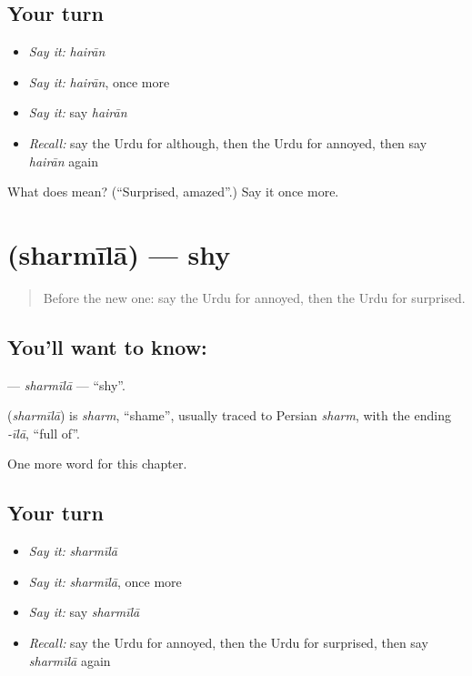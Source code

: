 \subsection*{Your turn}
\begin{itemize}
\raggedright
  \item \emph{Say it:} \emph{hairān}
  \item \emph{Say it:} \emph{hairān}, once more
  \item \emph{Say it:} say \emph{hairān}
  \item \emph{Recall:} say the Urdu for although, then the Urdu for annoyed, then say \emph{hairān} again
\end{itemize}

\begin{tcolorbox}[breakable,colback=teal!4,colframe=teal!35!black,title={Before you move on}]
What does  mean? (\textquotedblleft{}Surprised, amazed\textquotedblright{}.) Say it once more.
\end{tcolorbox}
\section[\texorpdfstring{\ur{شرمیلا} (sharmīlā)}{شرمیلا (sharmīlā)}]{ (sharmīlā) — shy}

\label{lesson:UR-C221-sharmila}



\begin{quote}
Before the new one: say the Urdu for annoyed, then the Urdu for surprised.
\end{quote}

\subsection*{You'll want to know: }
\textbf{} — \emph{sharmīlā} — \textquotedblleft{}shy\textquotedblright{}.

\begin{cousinweb}
\textbf{} (\emph{sharmīlā}) is \emph{sharm}, \textquotedblleft{}shame\textquotedblright{}, usually traced to Persian \emph{sharm}, with the ending \emph{-īlā}, \textquotedblleft{}full of\textquotedblright{}.
\end{cousinweb}

\begin{grammarlens}[title={What you've built}]
One more word for this chapter.
\end{grammarlens}

\subsection*{Your turn}
\begin{itemize}
\raggedright
  \item \emph{Say it:} \emph{sharmīlā}
  \item \emph{Say it:} \emph{sharmīlā}, once more
  \item \emph{Say it:} say \emph{sharmīlā}
  \item \emph{Recall:} say the Urdu for annoyed, then the Urdu for surprised, then say \emph{sharmīlā} again
\end{itemize}

